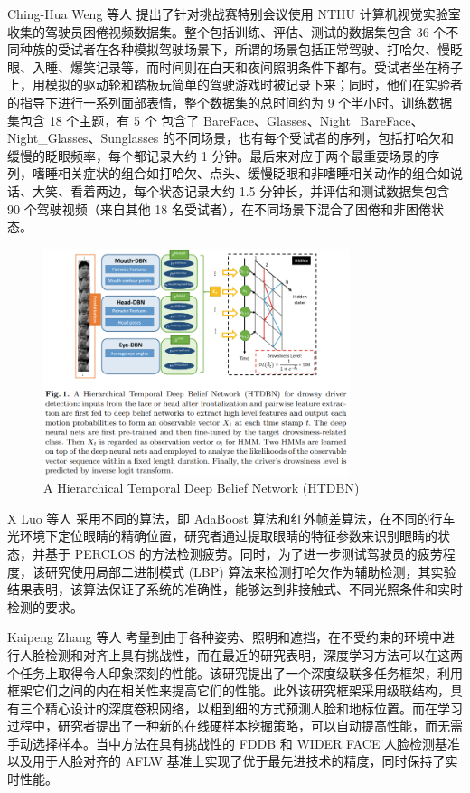 Ching-Hua Weng 等人 \cite{weng2016driver} 提出了针对挑战赛特别会议使用 NTHU 计算机视觉实验室收集的驾驶员困倦视频数据集。整个包括训练、评估、测试的数据集包含 36 个不同种族的受试者在各种模拟驾驶场景下，所谓的场景包括正常驾驶、打哈欠、慢眨眼、入睡、爆笑记录等，而时间则在白天和夜间照明条件下都有。受试者坐在椅子上，用模拟的驱动轮和踏板玩简单的驾驶游戏时被记录下来；同时，他们在实验者的指导下进行一系列面部表情，整个数据集的总时间约为 9 个半小时。训练数据集包含 18 个主题，有 5 个 包含了 BareFace、Glasses、Night\_BareFace、Night\_Glasses、Sunglasses 的不同场景，也有每个受试者的序列，包括打哈欠和缓慢的眨眼频率，每个都记录大约 1 分钟。最后来对应于两个最重要场景的序列，嗜睡相关症状的组合如打哈欠、点头、缓慢眨眼和非嗜睡相关动作的组合如说话、大笑、看着两边，每个状态记录大约 1.5 分钟长，并评估和测试数据集包含 90 个驾驶视频（来自其他 18 名受试者），在不同场景下混合了困倦和非困倦状态。


\begin{figure}[htb]
\centering 
\includegraphics[width=0.80\textwidth]{img/ch3m2.png} 
\caption{A Hierarchical Temporal Deep Belief Network (HTDBN)}
\label{Test}
\end{figure}



X Luo 等人 \cite{luo2013driver} 采用不同的算法，即 AdaBoost 算法和红外帧差算法，在不同的行车光环境下定位眼睛的精确位置，研究者通过提取眼睛的特征参数来识别眼睛的状态，并基于 PERCLOS 的方法检测疲劳。同时，为了进一步测试驾驶员的疲劳程度，该研究使用局部二进制模式 (LBP) 算法来检测打哈欠作为辅助检测，其实验结果表明，该算法保证了系统的准确性，能够达到非接触式、不同光照条件和实时检测的要求。

Kaipeng Zhang 等人 \cite{zhang2016joint} 考量到由于各种姿势、照明和遮挡，在不受约束的环境中进行人脸检测和对齐上具有挑战性，而在最近的研究表明，深度学习方法可以在这两个任务上取得令人印象深刻的性能。该研究提出了一个深度级联多任务框架，利用框架它们之间的内在相关性来提高它们的性能。此外该研究框架采用级联结构，具有三个精心设计的深度卷积网络，以粗到细的方式预测人脸和地标位置。而在学习过程中，研究者提出了一种新的在线硬样本挖掘策略，可以自动提高性能，而无需手动选择样本。当中方法在具有挑战性的 FDDB 和 WIDER FACE 人脸检测基准以及用于人脸对齐的 AFLW 基准上实现了优于最先进技术的精度，同时保持了实时性能。